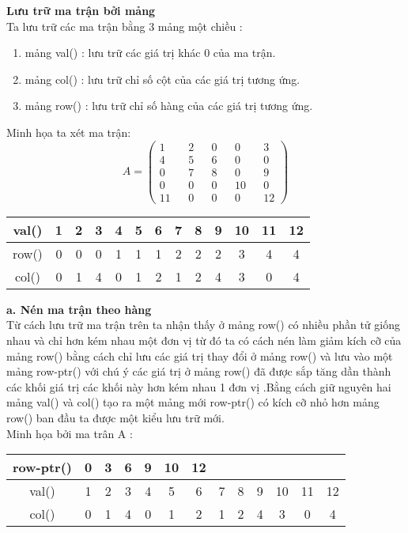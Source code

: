 \noindent\textbf{Lưu trữ ma trận bởi mảng}\\
Ta lưu trữ các ma trận bằng 3 mảng một chiều :
\begin{enumerate}
\item mảng val() : lưu trữ các giá trị khác 0 của ma trận.
\item mảng col() : lưu trữ chỉ số cột của các giá trị tương ứng.
\item mảng row() : lưu trữ chỉ số hàng của các giá trị tương ứng. 
\end{enumerate}
Minh họa ta xét ma trận:
$$ A = \left(\begin{matrix} 1&&2&&0&&0&&3\\4&&5&&6&&0&&0\\0&&7&&8&&0&&9\\0&&0&&0&&10&&0\\11&&0&&0&&0&&12\end{matrix} \right)$$
\begin{center}
\begin{tabular}{|c|c|c|c|c|c|c|c|c|c|c|c|c|}
\hline val()&1&2&3&4&5&6&7&8&9&10&11&12\\
\hline row()&0&0&0&1&1&1&2&2&2&3&4&4\\
\hline col()&0&1&4&0&1&2 &1&2&4&3&0&4\\
\hline
\end{tabular}
\end{center}
\textbf{a. Nén ma trận theo hàng}\\
Từ cách lưu trữ ma trận trên ta nhận thấy ở mảng row() có nhiều phần tử giống nhau và chỉ hơn kém nhau một đơn vị từ đó ta có cách nén làm giảm kích cỡ của mảng row() bằng cách chỉ lưu các giá trị thay đổi ở mảng row() và lưu vào một mảng row-ptr() với chú ý các giá trị ở mảng row() đã được sắp tăng dần thành các khối giá trị các khối này hơn kém nhau 1 đơn vị .Bằng cách giữ nguyên hai mảng val() và col() tạo ra một mảng mới row-ptr() có kích cỡ nhỏ hơn mảng row() ban đầu ta được một kiểu lưu trữ mới.\\
Minh họa bởi ma trân A :\\
\begin{center}
\begin{tabular}{|c|c|c|c|c|c|c|c|c|c|c|c|c|}
\hline row-ptr()&0&3&6&9&10&12&&&&&&\\
\hline val()&1&2&3&4&5&6&7&8&9&10&11&12\\
\hline col()&0&1&4&0&1&2 &1&2&4&3&0&4\\
\hline
\end{tabular}
\end{center}
